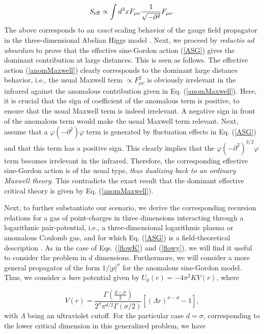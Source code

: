 \documentclass[a4paper,showpacs,preprintnumbers,amsmath,amssymb,prl,twocolumn]{revtex4}
\begin{document}
\begin{equation}
\label{anomMaxwell}
S_{\rm eff}\propto\int d^3xF_{\mu\nu}\frac{1}{\sqrt{
-\partial^2}}F_{\mu\nu}.
\end{equation}
The above corresponds to an {\it exact} scaling 
behavior of the gauge field propagator in the three-dimensional 
Abelian Higgs model \cite{Herbut}. Next, we proceed by 
{\it reductio ad absurdum} to prove that the effective 
sine-Gordon action (\ref{ASG}) gives the dominant contribution 
at large distances. This is seen as follows.  
The effective action (\ref{anomMaxwell}) clearly corresponds 
to the dominant large distance behavior, i.e., the usual 
Maxwell term $\propto F_{\mu\nu}^2$ is obviously irrelevant in the 
infrared against the anomalous contribution given in Eq. (\ref{anomMaxwell}). 
Here, it is crucial that the sign of coefficient of the anomalous term is
positive, to ensure that the usual Maxwell term is indeed irrelevant. 
A negative sign in front of the anomalous term would make the usual Maxwell 
term relevant. Next, assume that a  $\varphi(-\partial^2)\varphi$ 
term is generated by fluctuation effects in Eq. (\ref{ASG}) and that  
this term has a positive sign. This clearly implies that the                  
$\varphi(-\partial^2)^{3/2}\varphi$ term becomes irrelevant in the infrared. 
Therefore, the corresponding effective sine-Gordon action is of the usual 
type, {\it thus dualizing back to an ordinary Maxwell theory}. This contradicts 
the exact result that the dominant effective critical theory is given by 
Eq. (\ref{anomMaxwell}).  

Next, to further substantiate our scenario, we derive the corresponding 
recursion relations for a gas of point-charges in three dimensions
interacting through a logarithmic pair-potential, i.e., a three-dimensional
logarithmic plasma or anomalous Coulomb gas, and for which Eq. (\ref{ASG}) 
is a field-theoretical description \cite{KNS}. As in the case of Eqs. 
(\ref{flowK}) and (\ref{flowy}), we will find it useful to consider the problem 
in $d$ dimensions. Furthermore, we will consider a more general propagator 
of the form $1/|p|^\sigma$ for the anomalous sine-Gordon model. Thus, we 
consider a {\it bare} potential given by $U_0(r)=-4\pi^2KV(r)$, where 

\begin{equation}
\label{potential}
V(r)=\frac{\Gamma\left(\frac{d-\sigma}{2}\right)}{
2^\sigma\pi^{d/2}\Gamma(\sigma/2)}[(\Lambda r)^{\sigma-d}-1],
\end{equation}
with $\Lambda$ being 
an ultraviolet cutoff. For the particular case $d=\sigma$, 
corresponding to the lower critical dimension in this generalized problem, we 
have
\end{document}
